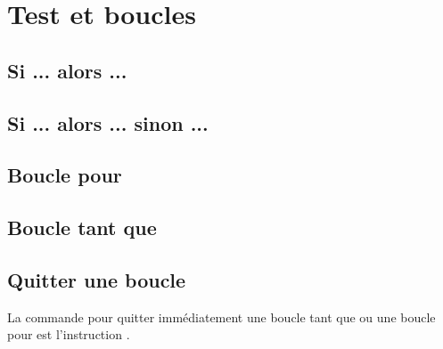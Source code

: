 \documentclass[11pt,class=report,crop=false]{standalone}
\begin{document}



\section{Test et boucles}

\subsection{Si ... alors ...}

\subsection{Si ... alors ... sinon ...}


\subsection{Boucle pour}


\subsection{Boucle tant que}


\subsection{Quitter une boucle}

La commande \Python{} pour quitter immédiatement une boucle \og{}tant que\fg{}
ou une boucle \og{}pour\fg{} est l'instruction .
\end{document}
